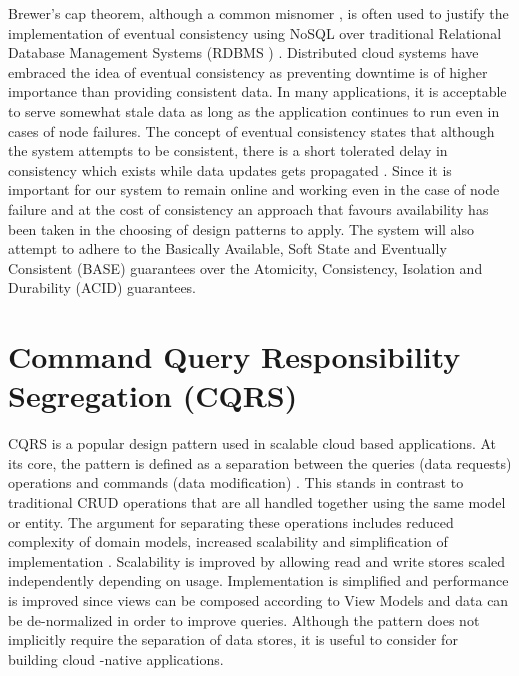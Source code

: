 Brewer's cap theorem, although a common misnomer \cite{Brewer2012}, is often used to justify the implementation of eventual consistency using NoSQL over traditional Relational Database Management Systems (RDBMS ) \cite{Wilder2012-so}. Distributed cloud systems have embraced the idea of eventual consistency as preventing downtime is of higher importance than providing consistent data. In many applications, it is acceptable to serve somewhat stale data as long as the application continues to run even in cases of node failures. The concept of eventual consistency states that although the system attempts to be consistent, there is a short tolerated delay in consistency which exists while data updates gets propagated \cite{Wilder2012-so}. Since it is important for our system to remain online and working even in the case of node failure and at the cost of consistency an approach that favours availability has been taken in the choosing of design patterns to apply. The system will also attempt to adhere to the Basically Available, Soft State and Eventually Consistent (BASE) guarantees over the Atomicity, Consistency, Isolation and Durability (ACID) guarantees.
 
 
\section{Command Query Responsibility Segregation (CQRS)}
 
CQRS is a popular design pattern used in scalable cloud based applications. At its core, the pattern is defined as a separation between the queries (data requests) operations and commands (data modification) \cite{Homer2014}. This stands in contrast to traditional CRUD operations that are all handled together using the same model or entity. The argument for separating these operations includes reduced complexity of domain models, increased scalability and simplification of implementation \cite{Homer2014}. Scalability is improved by allowing read and write stores scaled independently depending on usage. Implementation is simplified and performance is improved since views can be composed according to View Models and data can be de-normalized in order to improve queries. Although the pattern does not implicitly require the separation of data stores, it is useful to consider for building cloud -native applications. 
 
